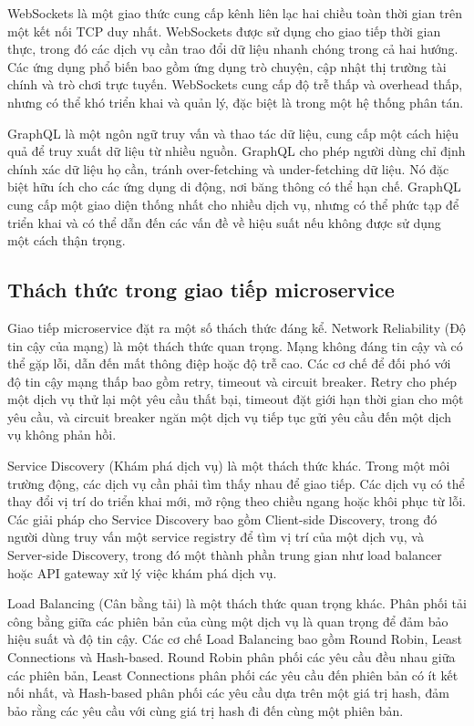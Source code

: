 WebSockets là một giao thức cung cấp kênh liên lạc hai chiều toàn thời gian
trên một kết nối TCP duy nhất. WebSockets được sử dụng cho giao tiếp thời gian
thực, trong đó các dịch vụ cần trao đổi dữ liệu nhanh chóng trong cả hai hướng.
Các ứng dụng phổ biến bao gồm ứng dụng trò chuyện, cập nhật thị trường tài
chính và trò chơi trực tuyến. WebSockets cung cấp độ trễ thấp và overhead thấp,
nhưng có thể khó triển khai và quản lý, đặc biệt là trong một hệ thống phân
tán.

GraphQL là một ngôn ngữ truy vấn và thao tác dữ liệu, cung cấp một cách hiệu
quả để truy xuất dữ liệu từ nhiều nguồn. GraphQL cho phép người dùng chỉ định
chính xác dữ liệu họ cần, tránh over-fetching và under-fetching dữ liệu. Nó đặc
biệt hữu ích cho các ứng dụng di động, nơi băng thông có thể hạn chế. GraphQL
cung cấp một giao diện thống nhất cho nhiều dịch vụ, nhưng có thể phức tạp để
triển khai và có thể dẫn đến các vấn đề về hiệu suất nếu không được sử dụng một
cách thận trọng.

\subsection{Thách thức trong giao tiếp microservice}
Giao tiếp microservice đặt ra một số thách thức đáng kể. Network Reliability
(Độ tin cậy của mạng) là một thách thức quan trọng. Mạng không đáng tin cậy và
có thể gặp lỗi, dẫn đến mất thông điệp hoặc độ trễ cao. Các cơ chế để đối phó
với độ tin cậy mạng thấp bao gồm retry, timeout và circuit breaker. Retry cho
phép một dịch vụ thử lại một yêu cầu thất bại, timeout đặt giới hạn thời gian
cho một yêu cầu, và circuit breaker ngăn một dịch vụ tiếp tục gửi yêu cầu đến
một dịch vụ không phản hồi.

Service Discovery (Khám phá dịch vụ) là một thách thức khác. Trong một môi
trường động, các dịch vụ cần phải tìm thấy nhau để giao tiếp. Các dịch vụ có
thể thay đổi vị trí do triển khai mới, mở rộng theo chiều ngang hoặc khôi phục
từ lỗi. Các giải pháp cho Service Discovery bao gồm Client-side Discovery,
trong đó người dùng truy vấn một service registry để tìm vị trí của một dịch
vụ, và Server-side Discovery, trong đó một thành phần trung gian như load
balancer hoặc API gateway xử lý việc khám phá dịch vụ.

Load Balancing (Cân bằng tải) là một thách thức quan trọng khác. Phân phối tải
công bằng giữa các phiên bản của cùng một dịch vụ là quan trọng để đảm bảo hiệu
suất và độ tin cậy. Các cơ chế Load Balancing bao gồm Round Robin, Least
Connections và Hash-based. Round Robin phân phối các yêu cầu đều nhau giữa các
phiên bản, Least Connections phân phối các yêu cầu đến phiên bản có ít kết nối
nhất, và Hash-based phân phối các yêu cầu dựa trên một giá trị hash, đảm bảo
rằng các yêu cầu với cùng giá trị hash đi đến cùng một phiên bản.

